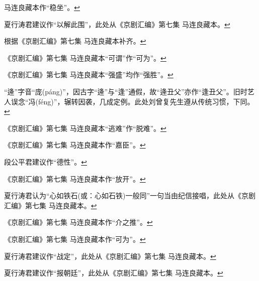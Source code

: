   马连良藏本作``稳坐''。\protect\hyperlink{fnref98}{↩}
\item
  \leavevmode\hypertarget{fn99}{}%
  夏行涛君建议作``以解此围''，此处从《京剧汇编》第七集
  马连良藏本。\protect\hyperlink{fnref99}{↩}
\item
  \leavevmode\hypertarget{fn100}{}%
  根据《京剧汇编》第七集 马连良藏本补齐。\protect\hyperlink{fnref100}{↩}
\item
  \leavevmode\hypertarget{fn101}{}%
  《京剧汇编》第七集
  马连良藏本``可谓''作``可为''。\protect\hyperlink{fnref101}{↩}
\item
  \leavevmode\hypertarget{fn102}{}%
  《京剧汇编》第七集
  马连良藏本``强盛''均作``强胜''。\protect\hyperlink{fnref102}{↩}
\item
  \leavevmode\hypertarget{fn103}{}%
  ``逄''字音``庞(páng)''，因古字``逄''与``逢''通假，故``逄丑父''亦作``逢丑父''。旧时艺人误念``冯(féng)''，辗转因袭，几成定例。此处刘曾复先生遵从传统习惯，下同。\protect\hyperlink{fnref103}{↩}
\item
  \leavevmode\hypertarget{fn104}{}%
  《京剧汇编》第七集
  马连良藏本``逃难''作``脱难''。\protect\hyperlink{fnref104}{↩}
\item
  \leavevmode\hypertarget{fn105}{}%
  《京剧汇编》第七集
  马连良藏本作``嘉臣''。\protect\hyperlink{fnref105}{↩}
\item
  \leavevmode\hypertarget{fn106}{}%
  段公平君建议作``德性''。\protect\hyperlink{fnref106}{↩}
\item
  \leavevmode\hypertarget{fn107}{}%
  《京剧汇编》第七集
  马连良藏本作``放开''。\protect\hyperlink{fnref107}{↩}
\item
  \leavevmode\hypertarget{fn108}{}%
  夏行涛君认为``心如铁石(或：心如石铁)一般同''一句当由纪信接唱，此处从《京剧汇编》第七集
  马连良藏本。\protect\hyperlink{fnref108}{↩}
\item
  \leavevmode\hypertarget{fn109}{}%
  《京剧汇编》第七集
  马连良藏本作``介之推''。\protect\hyperlink{fnref109}{↩}
\item
  \leavevmode\hypertarget{fn110}{}%
  《京剧汇编》第七集
  马连良藏本作``可为''。\protect\hyperlink{fnref110}{↩}
\item
  \leavevmode\hypertarget{fn111}{}%
  夏行涛君建议作``战定''，此处从《京剧汇编》第七集
  马连良藏本。\protect\hyperlink{fnref111}{↩}
\item
  \leavevmode\hypertarget{fn112}{}%
  夏行涛君建议作``报朝廷''，此处从《京剧汇编》第七集
  马连良藏本。\protect\hyperlink{fnref112}{↩}
\item
  \leavevmode\hypertarget{fn113}{}%
